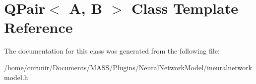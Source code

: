 \hypertarget{class_q_pair}{}\section{Q\+Pair$<$ A, B $>$ Class Template Reference}
\label{class_q_pair}


The documentation for this class was generated from the following file\+:\begin{DoxyCompactItemize}
\item 
/home/curunir/\+Documents/\+M\+A\+S\+S/\+Plugins/\+Neural\+Network\+Model/ineuralnetworkmodel.\+h\end{DoxyCompactItemize}
